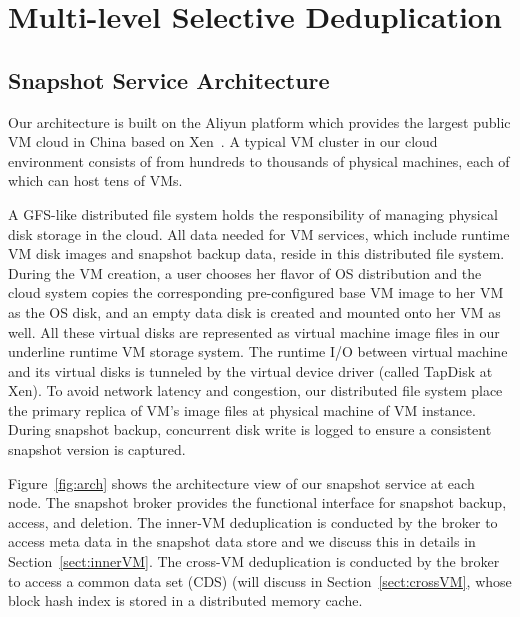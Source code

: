 \section{Multi-level Selective Deduplication}
\label{sect:arch}

\subsection{Snapshot Service Architecture}
Our architecture is built on the Aliyun platform which provides the largest public VM cloud in China 
based on Xen~\cite{Xen2003}. A typical VM cluster in our cloud environment
consists of from hundreds to thousands of physical machines, each of which can
host tens of VMs.

A GFS-like distributed file system holds the responsibility of managing physical disk storage
in the cloud. All data needed for VM services, which include runtime VM disk images and snapshot backup data,
reside in this distributed file system.
During the VM creation, a user chooses her flavor of OS distribution and the cloud system 
copies the corresponding pre-configured base VM image to her VM as the OS disk, 
and an empty data disk is created and mounted onto her VM as well. 
All these virtual disks are represented as virtual machine image files in our
underline runtime VM storage system. The runtime I/O between virtual machine and its virtual
disks is tunneled by the virtual device driver (called TapDisk at Xen). To avoid network latency and congestion, 
our distributed file system place the primary replica of VM's 
image files at physical machine of VM instance.
During snapshot backup, concurrent disk write is logged 
to ensure a consistent snapshot version is captured. 

Figure~\ref{fig:arch} shows the architecture view of our snapshot service
at each node. The snapshot broker provides the functional interface for  snapshot backup, access, and deletion.
The inner-VM  deduplication is conducted by the broker to access meta data in the snapshot data store
and we discuss this in details in Section~\ref{sect:innerVM}.
The cross-VM deduplication is conducted by the broker to access 
a common data set (CDS) (will discuss in Section~\ref{sect:crossVM},
whose block hash index is stored in a distributed memory cache. 

